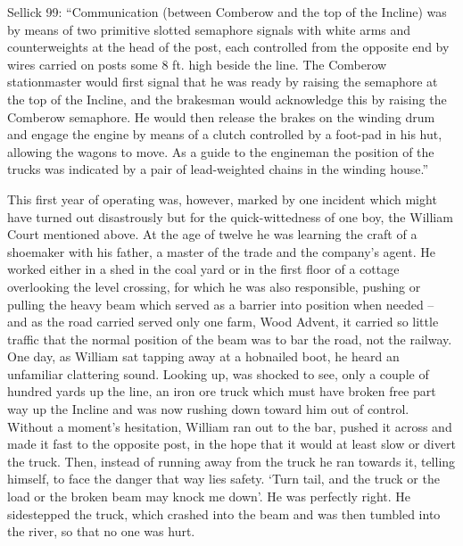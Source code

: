\documentclass[10pt,a4paper]{article}
\begin{document}
Sellick 99: “Communication (between Comberow and the top of the Incline) was by means of two primitive slotted semaphore signals with white arms and counterweights at the head of the post, each controlled from the opposite end by wires carried on posts some 8 ft. high beside the line. The Comberow stationmaster would first signal that he was ready by raising the semaphore at the top of the Incline, and the brakesman would acknowledge this by raising the Comberow semaphore. He would then release the brakes on the winding drum and engage the engine by means of a clutch controlled by a foot-pad in his hut, allowing the wagons to move. As a guide to the engineman the position of the trucks was indicated by a pair of lead-weighted chains in the winding house.”

This first year of operating was, however, marked by one incident which might have turned out disastrously but for the quick-wittedness of one boy, the William Court mentioned above. At the age of twelve he was learning the craft of a shoemaker with his father, a master of the trade and the company’s agent. He worked either in a shed in the coal yard or in the first floor of a cottage overlooking the level crossing, for which he was also responsible, pushing or pulling the heavy beam which served as a barrier into position when needed – and as the road carried served only one farm, Wood Advent, it carried so little traffic that the normal position of the beam was to bar the road, not the railway. One day, as William sat tapping away at a hobnailed boot, he heard an unfamiliar clattering sound. Looking up,  was shocked to see, only a couple of hundred yards up the line, an iron ore truck which must have broken free part way up the Incline and was now rushing down toward him out of control. Without a moment’s hesitation, William ran out to the bar, pushed it across and made it fast to the opposite post, in the hope that it would at least slow or divert the truck. Then, instead of running away from the truck he ran towards it, telling himself, to face the danger that way lies safety. ‘Turn tail, and the truck or the load or the broken beam may knock me down’.  He was perfectly right. He sidestepped the truck, which crashed into the beam and was then tumbled into the river, so that no one was hurt.
\end{document}
